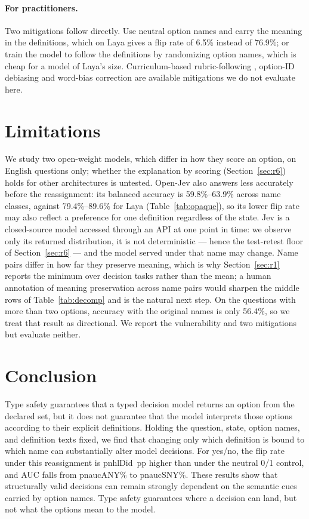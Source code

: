 \documentclass[11pt]{article}
\newcommand{\m}[1]{\csname pn#1\endcsname}       %
\newcommand{\opt}[1]{\textsf{#1}}          %
\begin{document}
\paragraph{For practitioners.} Two mitigations follow directly. Use neutral option names and carry the
meaning in the definitions, which on Laya gives a flip rate of 6.5\% instead of 76.9\%; or train
the model to follow the definitions by randomizing option names, which is cheap for a model of
Laya's size. Curriculum-based rubric-following \citep{lim2026rubric},
option-ID debiasing \citep{zheng2024mcq} and word-bias correction \citep{liusie2023wordbias} are
available mitigations we do not evaluate here.

\section{Limitations}

We study two open-weight models, which differ in how they score an option, on English questions
only; whether the explanation by scoring (Section~\ref{sec:r6}) holds for other architectures is
untested. Open-Jev also answers less accurately
before the reassignment: its balanced accuracy is 59.8\%--63.9\% across name classes, against
79.4\%--89.6\% for Laya (Table~\ref{tab:opaque}), so its lower flip rate may also reflect a
preference for one definition regardless of the state. Jev is a closed-source
model accessed through an API at one point in time: we observe only its returned distribution, it
is not deterministic --- hence the test-retest floor of Section~\ref{sec:r6} --- and the model served
under that name may change. Name pairs differ in how far they preserve meaning, which is why
Section~\ref{sec:r1} reports the minimum over decision tasks rather than the mean; a human
annotation of meaning preservation across name pairs would sharpen the middle rows of
Table~\ref{tab:decomp} and is the natural next step. On the questions with more than two options, accuracy with
the original names is only 56.4\%, so we treat that result as directional. We report the vulnerability and two mitigations but
evaluate neither.

\section{Conclusion}
Type safety guarantees that a typed decision model returns an option from the declared set, but it does not guarantee that the model interprets those options according to their explicit definitions. Holding the question, state, option names, and definition texts fixed, we find that changing only which definition is bound to which name can substantially alter model decisions. For \opt{yes}/\opt{no}, the flip rate under this reassignment is \m{hlDid}~pp higher than under the neutral \opt{0}/\opt{1} control, and AUC falls from \m{aucANY}\% to \m{aucSNY}\%. These results show that structurally valid decisions can remain strongly dependent on the semantic cues carried by option names. Type safety guarantees where a decision can land, but not what the options mean to the model.
\end{document}
